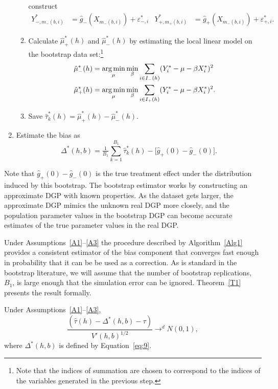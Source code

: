\documentclass[12pt,fleqn]{article}
\begin{document}
\begin{algorithm}
\begin{enumerate}
\begin{enumerate}
      construct
      \begin{align*}
        Y_{-,m_-(b,i)}^* &= \hat g_-(X_{m_-(b,i)}) + \varepsilon_{-,i}^{*} &
        Y_{+,m_+(b,i)}^* &= \hat g_+(X_{m_-(b,i)}) + \varepsilon_{+,i}^{*}.
      \end{align*}
    \item Calculate $\hat\mu_+^*(h)$ and $\hat\mu_-^*(h)$ by estimating the
      local linear model on the bootstrap data set:\footnote{%
        Note that the indices of summation are chosen to correspond to the
        indices of the variables generated in the previous step.} %
      \begin{align*}
        \hat\mu_-^*(h)
        &= \argmin_{\mu} \min_{\beta} \ssum[-]{i}{h}
          (Y_i^* - \mu - \beta X_i^*)^2 \\
        \hat\mu_+^*(h)
        &= \argmin_{\mu} \min_{\beta} \ssum[+]{i}{h}
          (Y_i^* - \mu - \beta X_i^*)^2.
      \end{align*}
    \item Save $\hat\tau^*_k(h) = \hat\mu_+^*(h) - \hat\mu_-^*(h)$.
    \end{enumerate}
  \item Estimate the bias as
    \begin{equation}
      \label{eq:9}
      \Delta^*(h,b) = \tfrac{1}{B_1} \sum_{k=1}^{B_1} \hat\tau^*_k(h) -
      \big[\hat g_+(0) - \hat g_-(0)\big].
    \end{equation}
  \end{enumerate}
\end{algorithm}
Note that $\hat g_+(0) - \hat g_-(0)$ is the true treatment effect under the
distribution induced by this bootstrap. The bootstrap estimator works by
constructing an approximate DGP with known properties. As the dataset gets
larger, the approximate DGP mimics the unknown real DGP more closely, and the
population parameter values in the bootstrap DGP can become accurate estimates
of the true parameter values in the real DGP.

Under Assumptions~\ref{A1}--\ref{A3} the procedure described by
Algorithm~\ref{Alg1} provides a consistent estimator of the bias component that
converges fast enough in probability that it can be be used as a correction. As
is standard in the bootstrap literature, we will assume that the number of
bootstrap replications, $B_{1}$, is large enough that the simulation error can
be ignored. Theorem~\ref{T1} presents the result formally.

\begin{theorem}\label{T1}
  Under Assumptions~\ref{A1}--\ref{A3},
\begin{equation}
  \label{eq:4}
  \frac{(\hat\tau(h) - \Delta^{*}(h,b) - \tau)}{ V'(h, b)^{1/2}}
  \to^{d} N(0,1),
\end{equation}
where $\Delta^*(h,b)$ is defined by Equation~\ref{eq:9}.
\end{theorem}
\end{document}
